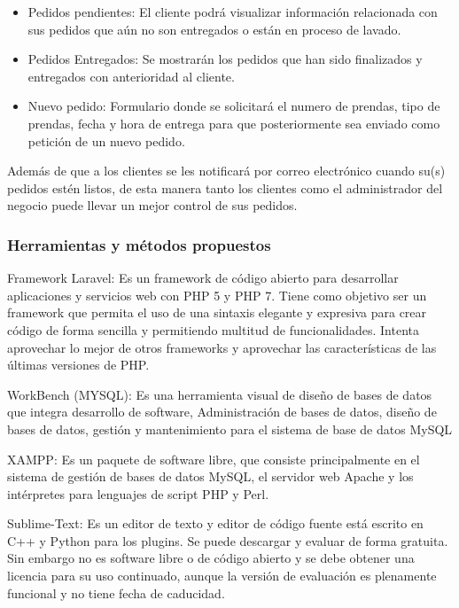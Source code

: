 \begin{itemize}
\item Pedidos pendientes: El cliente podrá visualizar información relacionada con sus pedidos que aún no son entregados o están en proceso de lavado.

\item Pedidos Entregados: Se mostrarán los pedidos que han sido finalizados y entregados con anterioridad al cliente.

\item Nuevo pedido: Formulario donde se solicitará el numero de prendas, tipo de prendas, fecha y hora de entrega para que posteriormente sea enviado como petición de un nuevo pedido.
\end{itemize}



Además de que a los clientes se les notificará por correo electrónico cuando su(s) pedidos estén listos, de esta manera tanto los clientes como el administrador del negocio puede llevar un mejor control de sus pedidos.


\subsubsection{Herramientas y métodos propuestos}


Framework Laravel: Es un framework de código abierto para desarrollar aplicaciones y servicios web con PHP 5 y PHP 7. Tiene como objetivo ser un framework que permita el uso de una sintaxis elegante y expresiva para crear código de forma sencilla y permitiendo multitud de funcionalidades. Intenta aprovechar lo mejor de otros frameworks y aprovechar las características de las últimas versiones de PHP.

WorkBench (MYSQL): Es una herramienta visual de diseño de bases de datos que integra desarrollo de software, Administración de bases de datos, diseño de bases de datos, gestión y mantenimiento para el sistema de base de datos MySQL

XAMPP: Es un paquete de software libre, que consiste principalmente en el sistema de gestión de bases de datos MySQL, el servidor web Apache y los intérpretes para lenguajes de script PHP y Perl.

Sublime-Text:  Es un editor de texto y editor de código fuente está escrito en C++ y Python para los plugins. Se puede descargar y evaluar de forma gratuita. Sin embargo no es software libre o de código abierto y se debe obtener una licencia para su uso continuado, aunque la versión de evaluación es plenamente funcional y no tiene fecha de caducidad.

